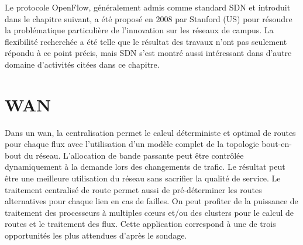 


Le protocole OpenFlow, généralement admis comme standard SDN et introduit dans le chapitre suivant, a été proposé en 2008 par Stanford (US) pour résoudre la problématique particulière de l'innovation sur les réseaux de campus. La flexibilité recherchée a été telle que le résultat des travaux n'ont pas seulement répondu à ce point précis, mais SDN s'est montré aussi intéressant dans d'autre domaine d'activités citées dans ce chapitre. \cite{OpenFlowStanfordOssification}


\section{WAN}
Dans un \gls{wan}, la centralisation permet le calcul déterministe et optimal de routes pour chaque flux avec l'utilisation d'un modèle complet de la topologie bout-en-bout du réseau. L'allocation de bande passante peut être contrôlée dynamiquement à la demande lors des changements de trafic. Le résultat peut être une meilleure utilisation du réseau sans sacrifier la qualité de service. Le traitement centralisé de route permet aussi de pré-déterminer les routes alternatives pour chaque lien en cas de failles. On peut profiter de la puissance de traitement des processeurs à multiples cœurs et/ou des \glspl{cluster} pour le calcul de routes et le traitement des flux. Cette application correspond à une de trois opportunités les plus attendues d'après le sondage. \cite{2013GuideSDNNVUseCases}





